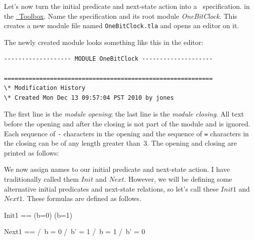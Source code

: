 \documentclass[fleqn,leqno]{article}
\begin{document}
Let's now turn the initial predicate and next-state action into a
\tlaplus\ specification.  
in the 
 \hyperref{http://research.microsoft.com/en-us/um/people/lamport/tla/toolbox.html}{}{}{\protect\tlaplus\
Toolbox}.
Name the specification and
its root module \emph{OneBitClock}.  This creates a new module file
named \texttt{OneBitClock.tla} and opens an editor on it.

The newly created module looks something like this in the editor:
\begin{display}
\begin{verbatim}
------------------- MODULE OneBitClock --------------------

===========================================================
\* Modification History
\* Created Mon Dec 13 09:57:04 PST 2010 by jones
\end{verbatim}
\end{display}
The first line is the 
\emph{module opening}; the last line is the
\emph{module closing}.  All text before the opening and after the
closing is not part of the module and is ignored.  Each sequence of
\verb|-| characters in the opening and the sequence of \verb|=|
characters in the closing can be of any length greater than~3.  
The opening and closing are printed as follows:
\begin{display}
\end{display}
We now assign names to our initial predicate and next-state action.  I
have traditionally called them $Init$ and $Next$.  However, we will be
defining some alternative initial predicates and next-state relations,
so let's call these $Init1$ and $Next1$.  These formulas are defined
as follows.
\begin{display}
\begin{notla}
Init1 == (b=0) \/ (b=1)
     
Next1 == \/ /\ b = 0
            /\ b' = 1
         \/ /\ b = 1
            /\ b' = 0
\end{notla}
\begin{tlatex}
%
\par\vspace{8.0pt}%
%
%
%
%
%
\end{tlatex}
\end{display}
\end{document}
